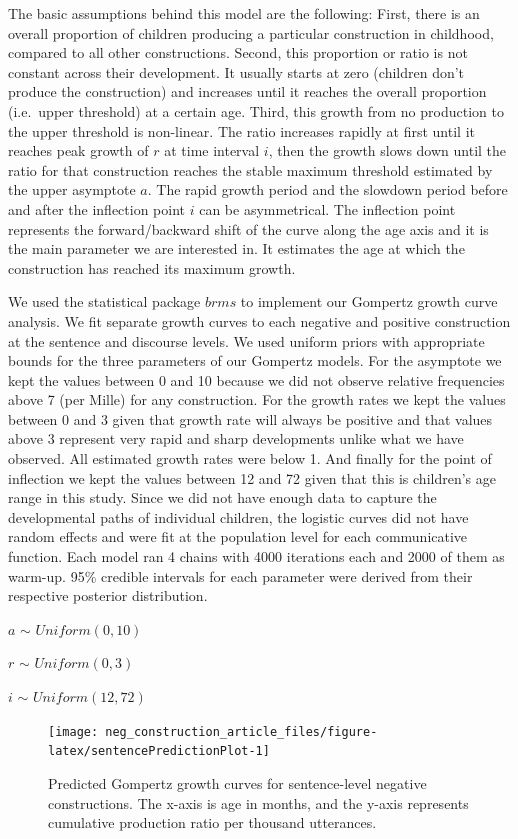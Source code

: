 \documentclass[
  man,floatsintext]{apa6}
\begin{document}
The basic assumptions behind this model are the following: First, there is an overall proportion of children producing a particular construction in childhood, compared to all other constructions. Second, this proportion or ratio is not constant across their development. It usually starts at zero (children don't produce the construction) and increases until it reaches the overall proportion (i.e.~upper threshold) at a certain age. Third, this growth from no production to the upper threshold is non-linear. The ratio increases rapidly at first until it reaches peak growth of \(r\) at time interval \(i\), then the growth slows down until the ratio for that construction reaches the stable maximum threshold estimated by the upper asymptote \(a\). The rapid growth period and the slowdown period before and after the inflection point \(i\) can be asymmetrical. The inflection point represents the forward/backward shift of the curve along the age axis and it is the main parameter we are interested in. It estimates the age at which the construction has reached its maximum growth.

We used the statistical package \(brms\) to implement our Gompertz growth curve analysis. We fit separate growth curves to each negative and positive construction at the sentence and discourse levels. We used uniform priors with appropriate bounds for the three parameters of our Gompertz models. For the asymptote we kept the values between 0 and 10 because we did not observe relative frequencies above 7 (per Mille) for any construction. For the growth rates we kept the values between 0 and 3 given that growth rate will always be positive and that values above 3 represent very rapid and sharp developments unlike what we have observed. All estimated growth rates were below 1. And finally for the point of inflection we kept the values between 12 and 72 given that this is children's age range in this study. Since we did not have enough data to capture the developmental paths of individual children, the logistic curves did not have random effects and were fit at the population level for each communicative function. Each model ran 4 chains with 4000 iterations each and 2000 of them as warm-up. 95\% credible intervals for each parameter were derived from their respective posterior distribution.

\(a\) \(\sim\) \(Uniform(0, 10)\)

\(r\) \(\sim\) \(Uniform(0, 3)\)

\(i\) \(\sim\) \(Uniform(12, 72)\)

\begin{figure}[H]

{\centering \texttt{[image: neg\_construction\_article\_files/figure-latex/sentencePredictionPlot-1]} 

}

\caption{Predicted Gompertz growth curves for sentence-level negative constructions. The x-axis is age in months, and the y-axis represents cumulative production ratio per thousand utterances.}\label{fig:sentencePredictionPlot}
\end{figure}
\end{document}
